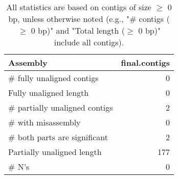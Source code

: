 \documentclass[12pt,a4paper]{article}
\begin{document}
\begin{table}[ht]
\begin{center}
\caption{All statistics are based on contigs of size $\geq$ 0 bp, unless otherwise noted (e.g., "\# contigs ($\geq$ 0 bp)" and "Total length ($\geq$ 0 bp)" include all contigs).}
\begin{tabular}{|l*{1}{|r}|}
\hline
Assembly & final.contigs \\ \hline
\# fully unaligned contigs & 0 \\ \hline
Fully unaligned length & 0 \\ \hline
\# partially unaligned contigs & 2 \\ \hline
\hspace{5mm}\# with misassembly & 0 \\ \hline
\hspace{5mm}\# both parts are significant & 2 \\ \hline
Partially unaligned length & 177 \\ \hline
\# N's & 0 \\ \hline
\end{tabular}
\end{center}
\end{table}
\end{document}
